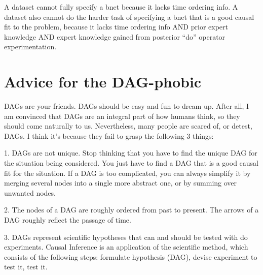 A dataset cannot fully specify a
bnet because it lacks time ordering info. A dataset also cannot do the harder
task of specifying a bnet that is a good causal fit to the problem, because
it lacks time ordering info AND prior expert knowledge AND expert knowledge
gained from posterior ``do” operator experimentation.

\section{Advice for the DAG-phobic}
\label{sec0-advice-dagophobic}

DAGs are your friends. DAGs should be easy and fun to dream up. After all, I
am convinced that DAGs are an integral part of how humans think, so they
should come naturally to us.  Nevertheless, many people are scared of, or
detest, DAGs. I think it’s because they fail to grasp the following 3 things:

1. DAGs are not unique. Stop thinking that you have to find the unique DAG
for the situation being considered. You just have to find a DAG that is a
good causal fit for the situation. If a DAG is too complicated, you can
always simplify it by merging several nodes into a single more abstract one,
or by summing over unwanted nodes.

2. The nodes of a DAG are roughly ordered from past to present. The arrows of a DAG roughly
reflect the passage of time.

3. DAGs represent scientific hypotheses that can and should be tested with
do experiments. Causal Inference is an
application of the scientific method, which consists
of the following steps:
formulate hypothesis (DAG), devise experiment
to test it, test it.
